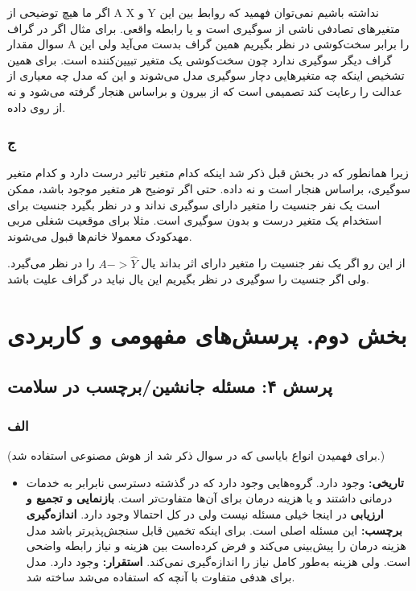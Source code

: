 اگر ما هیچ توضیحی از A X و Y نداشته باشیم نمی‌توان فهمید که روابط بین این متغیرهای تصادفی ناشی از سوگیری است و یا رابطه واقعی. برای مثال اگر در گراف سوال مقدار A را برابر سخت‌کوشی در نظر بگیریم همین گراف بدست می‌آید ولی این گراف دیگر سوگیری ندارد چون سخت‌کوشی یک متغیر تبیین‌کننده است. برای همین تشخیص اینکه چه متغیرهایی دچار سوگیری مدل می‌شوند و این که مدل چه معیاری از عدالت را رعایت کند تصمیمی است که از بیرون و براساس هنجار گرفته می‌شود و نه از روی داده.

\subsubsection{ج}
زیرا همانطور که در بخش قبل ذکر شد اینکه کدام متغیر تاثیر درست دارد و کدام متغیر سوگیری، براساس هنجار است و نه داده. حتی اگر توضیح هر متغیر موجود باشد، ممکن است یک نفر جنسیت را متغیر دارای سوگیری نداند و در نظر بگیرد جنسیت برای استخدام یک متغیر درست و بدون سوگیری است. مثلا برای موقعیت شغلی مربی مهدکودک معمولا خانم‌ها قبول می‌شوند.

از این رو اگر یک نفر جنسیت را متغیر دارای اثر بداند یال 
$A -> \hat{Y}$
را در نظر می‌گیرد. ولی اگر جنسیت را سوگیری در نظر بگیریم این یال نباید در گراف علیت باشد.

\section{بخش دوم. پرسش‌های مفهومی و کاربردی}
\subsection{پرسش ۴: مسئله جانشین/برچسب در سلامت}
\subsubsection{الف}
(برای فهمیدن انواع بایاسی که در سوال ذکر شد از هوش مصنوعی استفاده شد.)

\begin{itemize}
	\item 
	\textbf{تاریخی:}
	وجود دارد. گروه‌هایی وجود دارد که در گذشته دسترسی نابرابر به خدمات درمانی داشتند و یا هزینه درمان برای آن‌ها متفاوت‌تر است.
	\textbf{بازنمایی و تجمیع و ارزیابی}
	در اینجا خیلی مسئله نیست ولی در کل احتمالا وجود دارد.
	\textbf{اندازه‌گیری برچسب:}
	این مسئله اصلی است. برای اینکه تخمین قابل سنجش‌پذیرتر باشد مدل هزینه درمان را پیش‌بینی می‌کند و فرض کرده‌است بین هزینه و نیاز رابطه واضحی است. ولی هزینه به‌طور کامل نیاز را اندازه‌گیری نمی‌کند.
	\textbf{استقرار:}
	وجود دارد. مدل برای هدفی متفاوت با آنچه که استفاده می‌شد ساخته شد.
\end{itemize}

